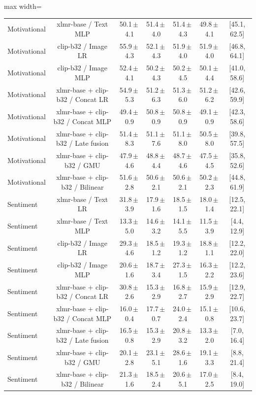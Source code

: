 \begin{table}[t]
\begin{adjustbox}{max width=\textwidth}
\begin{tabular}{lcccccc}
Motivational & xlmr-base / Text MLP & 50.1\,$\pm$\,4.1 & 51.4\,$\pm$\,4.0 & 51.4\,$\pm$\,4.3 & 49.8\,$\pm$\,4.1 & [45.1, 62.5] \\
Motivational & clip-b32 / Image LR & 55.9\,$\pm$\,4.3 & 52.1\,$\pm$\,4.3 & 51.9\,$\pm$\,4.0 & 51.9\,$\pm$\,4.0 & [46.8, 64.1] \\
Motivational & clip-b32 / Image MLP & 52.4\,$\pm$\,4.1 & 50.2\,$\pm$\,4.3 & 50.2\,$\pm$\,4.5 & 50.1\,$\pm$\,4.4 & [41.0, 58.6] \\
Motivational & xlmr-base + clip-b32 / Concat LR & 54.9\,$\pm$\,5.3 & 51.2\,$\pm$\,6.3 & 51.3\,$\pm$\,6.0 & 51.2\,$\pm$\,6.2 & [42.6, 59.9] \\
Motivational & xlmr-base + clip-b32 / Concat MLP & 49.4\,$\pm$\,0.9 & 50.8\,$\pm$\,0.9 & 50.8\,$\pm$\,0.9 & 49.1\,$\pm$\,0.9 & [42.3, 58.6] \\
Motivational & xlmr-base + clip-b32 / Late fusion & 51.4\,$\pm$\,8.3 & 51.1\,$\pm$\,7.6 & 51.1\,$\pm$\,8.0 & 50.5\,$\pm$\,8.0 & [39.8, 57.5] \\
Motivational & xlmr-base + clip-b32 / GMU & 47.9\,$\pm$\,4.6 & 48.8\,$\pm$\,4.4 & 48.7\,$\pm$\,4.6 & 47.5\,$\pm$\,4.5 & [35.8, 52.6] \\
Motivational & xlmr-base + clip-b32 / Bilinear & 51.6\,$\pm$\,2.8 & 50.6\,$\pm$\,2.1 & 50.6\,$\pm$\,2.1 & 50.2\,$\pm$\,2.3 & [44.8, 61.9] \\
Sentiment & xlmr-base / Text LR & 31.8\,$\pm$\,3.9 & 17.9\,$\pm$\,1.6 & 18.5\,$\pm$\,1.5 & 18.0\,$\pm$\,1.4 & [12.5, 22.1] \\
Sentiment & xlmr-base / Text MLP & 13.3\,$\pm$\,5.0 & 14.6\,$\pm$\,3.2 & 14.1\,$\pm$\,5.5 & 11.5\,$\pm$\,3.9 & [4.4, 12.9] \\
Sentiment & clip-b32 / Image LR & 29.3\,$\pm$\,4.6 & 18.5\,$\pm$\,1.2 & 19.3\,$\pm$\,1.2 & 18.8\,$\pm$\,1.1 & [12.2, 22.0] \\
Sentiment & clip-b32 / Image MLP & 20.6\,$\pm$\,1.6 & 18.7\,$\pm$\,3.4 & 27.3\,$\pm$\,1.5 & 16.3\,$\pm$\,2.2 & [12.2, 23.6] \\
Sentiment & xlmr-base + clip-b32 / Concat LR & 30.8\,$\pm$\,2.6 & 15.3\,$\pm$\,2.9 & 16.8\,$\pm$\,2.7 & 15.9\,$\pm$\,2.9 & [12.9, 22.7] \\
Sentiment & xlmr-base + clip-b32 / Concat MLP & 16.0\,$\pm$\,0.4 & 17.7\,$\pm$\,0.7 & 24.0\,$\pm$\,2.4 & 15.1\,$\pm$\,0.8 & [10.6, 23.7] \\
Sentiment & xlmr-base + clip-b32 / Late fusion & 16.5\,$\pm$\,0.8 & 15.3\,$\pm$\,2.9 & 20.8\,$\pm$\,3.2 & 13.3\,$\pm$\,2.0 & [7.0, 16.4] \\
Sentiment & xlmr-base + clip-b32 / GMU & 20.1\,$\pm$\,2.8 & 23.1\,$\pm$\,5.1 & 28.6\,$\pm$\,1.6 & 19.1\,$\pm$\,3.3 & [8.8, 21.4] \\
Sentiment & xlmr-base + clip-b32 / Bilinear & 21.3\,$\pm$\,1.6 & 18.5\,$\pm$\,2.4 & 20.6\,$\pm$\,5.1 & 17.0\,$\pm$\,2.5 & [8.4, 19.0] \\
\bottomrule
\end{tabular}
\end{adjustbox}
\end{table}
